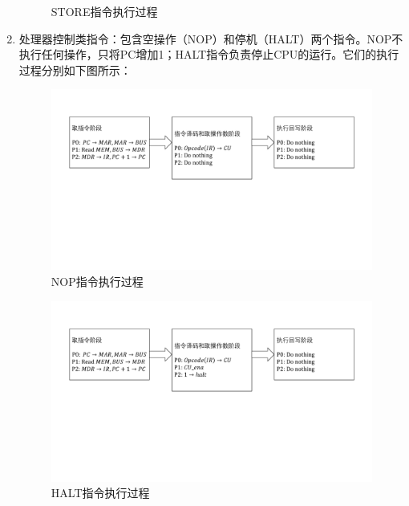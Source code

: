 \documentclass[titlepage, 11pt]{article}
\begin{document}
\begin{enumerate}
\begin{figure}[H]
			\caption{STORE指令执行过程}
		\end{figure}
		\item 处理器控制类指令：包含空操作（NOP）和停机（HALT）两个指令。NOP不执行任何操作，只将PC增加1；HALT指令负责停止CPU的运行。它们的执行过程分别如下图所示：
			\begin{figure}[H]
			\centering
			\includegraphics[scale=0.5]{11.pdf}
			\caption{NOP指令执行过程}
		\end{figure}
		\begin{figure}[H]
			\centering
			\includegraphics[scale=0.5]{12.pdf}
			\caption{HALT指令执行过程}
		\end{figure}
	\end{enumerate}
	
	
	
	
	
\end{document}
